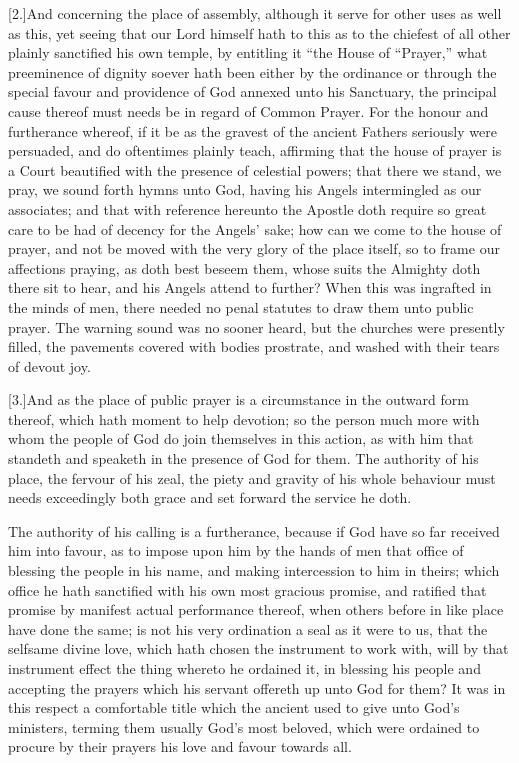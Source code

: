 [2.]And concerning the place of assembly, although it serve for other uses as well as this, yet seeing that our Lord himself hath to this as to the chiefest of all other plainly sanctified his own temple, by entitling it “the House of  “Prayer,” what preeminence of dignity soever hath been either by the ordinance or through the special favour and providence of God annexed unto his Sanctuary, the principal cause thereof must needs be in regard of Common Prayer.
 For the honour and furtherance whereof, if it be as the gravest of the ancient Fathers seriously were persuaded, and do oftentimes plainly teach, affirming that the house of prayer is a Court beautified with the presence of celestial powers; that there we stand, we pray, we sound forth hymns unto God, having his Angels intermingled as our associates; and that with reference hereunto the Apostle doth require so great care to be had of decency for the Angels’ sake; how can we come to the house of prayer, and not be moved with the very glory of the place itself, so to frame our affections praying, as doth best beseem them, whose suits the Almighty doth there sit to hear, and his Angels attend to further? When this was ingrafted in the minds of men, there needed no penal statutes to draw them unto public prayer. The warning sound was no sooner heard, but the churches were presently filled, the pavements covered with bodies prostrate, and washed with their tears of devout joy.

[3.]And as the place of public prayer is a circumstance in the outward form thereof, which hath moment to help devotion; so the person much more with whom the people of God do join themselves in this action, as with him that standeth and speaketh in the presence of God for them. The authority of his place, the fervour of his zeal, the piety and gravity of his whole behaviour must needs exceedingly both grace and set forward the service he doth.

The authority of his calling is a furtherance, because if God have so far received him into favour, as to impose upon  him by the hands of men that office of blessing the people in his name, and making intercession to him in theirs; which office he hath sanctified with his own most gracious promise, and ratified that promise by manifest actual performance thereof, when others before in like place have done the same; is not his very ordination a seal as it were to us, that the selfsame divine love, which hath chosen the instrument to work with, will by that instrument effect the thing whereto he ordained it, in blessing his people and accepting the prayers which his servant offereth up unto God for them? It was in this respect a comfortable title which the ancient used to give unto God’s ministers, terming them usually God’s most beloved, which were ordained to procure by their prayers his love and favour towards all.

